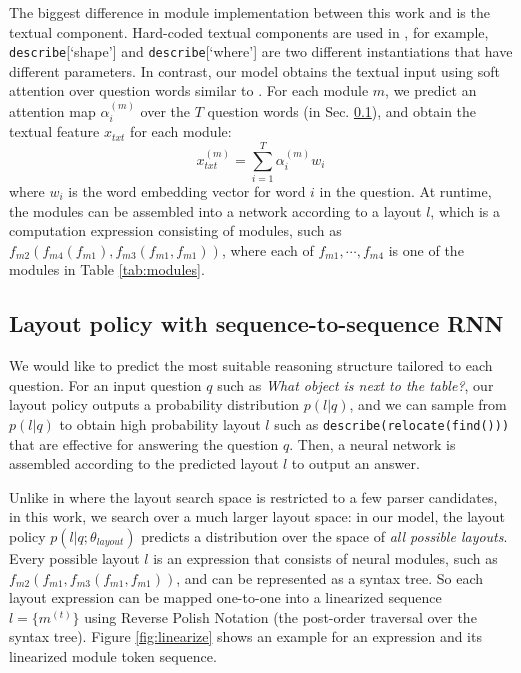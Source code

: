 \documentclass[10pt,twocolumn,letterpaper]{article}
\begin{document}
The biggest difference in module implementation between this work and \cite{andreas16neural} is the textual component. Hard-coded textual components are used in \cite{andreas16neural}, for example, \texttt{describe}[`shape'] and \texttt{describe}[`where'] are two different instantiations that have different parameters. In contrast, our model obtains the textual input using soft attention over question words similar to \cite{hu2017modeling}. For each module $m$, we predict an attention map $\alpha_{i}^{(m)}$ over the $T$ question words (in Sec. \ref{sec:gen_layout}), and obtain the textual feature $x_{txt}$ for each module:
\begin{equation}\label{eqn:txt_input}
x_{txt}^{(m)} = \sum_{i=1}^T \alpha_i^{(m)} w_i
\end{equation}
where $w_i$ is the word embedding vector for word $i$ in the question. At runtime, the modules can be assembled into a network according to a layout $l$, which is a computation expression consisting of modules, such as $f_{m2}(f_{m4}(f_{m1}), f_{m3}(f_{m1}, f_{m1}))$, where each of $f_{m1},\cdots,f_{m4}$ is one of the modules in Table \ref{tab:modules}. 

\subsection{Layout policy with sequence-to-sequence RNN}\label{sec:gen_layout}

We would like to predict the most suitable reasoning structure tailored to each question. For an input question $q$ such as \textit{What object is next to the table?}, our layout policy outputs a probability distribution $p(l | q)$, and we can sample from $p(l | q)$ to obtain high probability layout $l$ such as \texttt{describe(relocate(find()))} that are effective for answering the question $q$. Then, a neural network is assembled according to the predicted layout $l$ to output an answer.

Unlike in \cite{andreas2016learning} where the layout search space is restricted to a few parser candidates, in this work, we search over a much larger layout space: in our model, the layout policy $p(l | q ; \theta_{layout})$ predicts a distribution over the space of \textit{all possible layouts}. Every possible layout $l$ is an expression that consists of neural modules, such as $f_{m2}(f_{m1}, f_{m3}(f_{m1}, f_{m1}))$, and can be represented as a syntax tree. So each layout expression can be mapped one-to-one into a linearized sequence $l=\{m^{(t)}\}$ using Reverse Polish Notation \cite{burks54analysis} (the post-order traversal over the syntax tree). Figure \ref{fig:linearize} shows an example for an expression and its linearized module token sequence.
\end{document}
